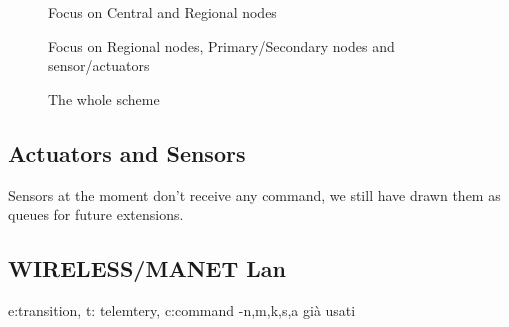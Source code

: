 \documentclass[11pt]{article}
\begin{document}
\begin{figure}[H]
	\hspace*{-3.75cm}
	\frame{}
	\caption{Focus on Central and Regional nodes}
\end{figure}
\begin{figure}[H]
	\hspace*{-3.75cm}
	\frame{}
	\caption{Focus on Regional nodes, Primary/Secondary nodes and sensor/actuators}
\end{figure}
\begin{figure}[H]
	\vspace*{-0.5cm}
	\hspace*{-3.75cm}
	\frame{}
	\caption{The whole scheme}
\end{figure}


\subsection{Actuators and Sensors}
Sensors at the moment don't receive any command, we still have drawn them as queues for future extensions.\\

\subsection{WIRELESS/MANET Lan}
e:transition, t: telemtery, c:command
-n,m,k,s,a già usati
\end{document}
